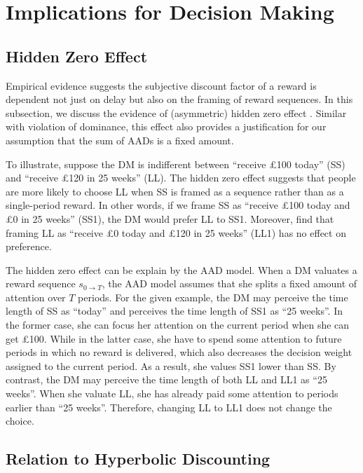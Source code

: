 \documentclass[
  12pt,
]{article}
\begin{document}
\hypertarget{implications-for-decision-making}{%
\section{Implications for Decision
Making}\label{implications-for-decision-making}}

\hypertarget{hidden-zero-effect}{%
\subsection{Hidden Zero Effect}\label{hidden-zero-effect}}

Empirical evidence suggests the subjective discount factor of a reward
is dependent not just on delay but also on the framing of reward
sequences. In this subsection, we discuss the evidence of (asymmetric)
hidden zero effect
\citep{magen2008hidden, radu2011mechanism, read2017value}. Similar with
violation of dominance, this effect also provides a justification for
our assumption that the sum of AADs is a fixed amount.

To illustrate, suppose the DM is indifferent between ``receive £100
today'' (SS) and ``receive £120 in 25 weeks'' (LL). The hidden zero
effect suggests that people are more likely to choose LL when SS is
framed as a sequence rather than as a single-period reward. In other
words, if we frame SS as ``receive £100 today and £0 in 25 weeks''
(SS1), the DM would prefer LL to SS1. Moreover, \citet{read2017value}
find that framing LL as ``receive £0 today and £120 in 25 weeks'' (LL1)
has no effect on preference.

The hidden zero effect can be explain by the AAD model. When a DM
valuates a reward sequence \(s_{0\rightarrow T}\), the AAD model assumes
that she splits a fixed amount of attention over \(T\) periods. For the
given example, the DM may perceive the time length of SS as ``today''
and perceives the time length of SS1 as ``25 weeks''. In the former
case, she can focus her attention on the current period when she can get
£100. While in the latter case, she have to spend some attention to
future periods in which no reward is delivered, which also decreases the
decision weight assigned to the current period. As a result, she values
SS1 lower than SS. By contrast, the DM may perceive the time length of
both LL and LL1 as ``25 weeks''. When she valuate LL, she has already
paid some attention to periods earlier than ``25 weeks''. Therefore,
changing LL to LL1 does not change the choice.

\hypertarget{relation-to-hyperbolic-discounting}{%
\subsection{Relation to Hyperbolic
Discounting}\label{relation-to-hyperbolic-discounting}}
\end{document}

